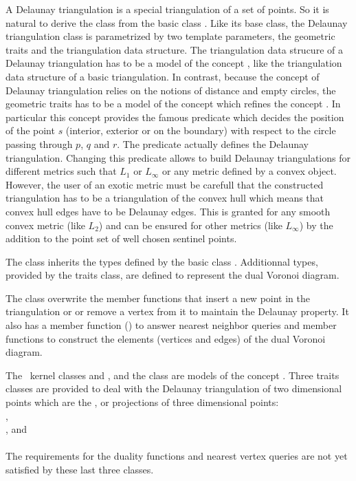 A Delaunay triangulation is a special triangulation of a set of points.
So it is natural to derive  
the class 
from the basic class .
Like its base class, the Delaunay triangulation class is parametrized
by  two template 
parameters,  the geometric traits 
and the triangulation data structure.
The triangulation data strucure  of a Delaunay triangulation
has to be a   model of the concept ,
like the triangulation  data structure
of a basic triangulation.
In contrast, because the
concept of Delaunay triangulation relies on the notions of
distance and  
empty circles, 
the geometric traits has to be a model of the concept
which refines the concept .
In particular this concept provides
the famous  predicate
which decides the position of  the point $s$ (interior, exterior
or on the boundary) with respect to the circle
passing through $p$, $q$ and $r$. The 
predicate actually defines the Delaunay triangulation.
Changing this predicate 
allows to build Delaunay triangulations for different metrics
such that $L_1$ or $L_{\infty}$ or any metric defined by a
convex object. However, the user of an exotic metric
must be carefull that the constructed triangulation 
has to be a triangulation of the convex hull
which means that convex hull edges have to be Delaunay edges.
This is granted for any smooth convex metric (like $L_2$)
and can be ensured for other metrics (like  $L_{\infty}$)
by the addition to the point set of well chosen sentinel points.



The class 
inherits the types defined by the 
basic class .
Additionnal types, provided by the traits class,
are defined to represent the dual Voronoi diagram.


The class 
overwrite the member functions that insert a new point
in the triangulation or
or remove a vertex  from it
to maintain the Delaunay property.
It also has a member function ()
to answer nearest neighbor queries
and member functions to construct the elements (vertices and edges)
of the dual Voronoi diagram.

The \cgal\  kernel classes  and
, and the class 
are models of the concept .
Three traits classes are provided to deal with
the Delaunay triangulation of two dimensional points which are
the ,  or  projections of three dimensional points:\\
,\\
, and\\
 \\
The requirements for the duality functions and nearest vertex
queries are not yet satisfied by
these last three classes.

